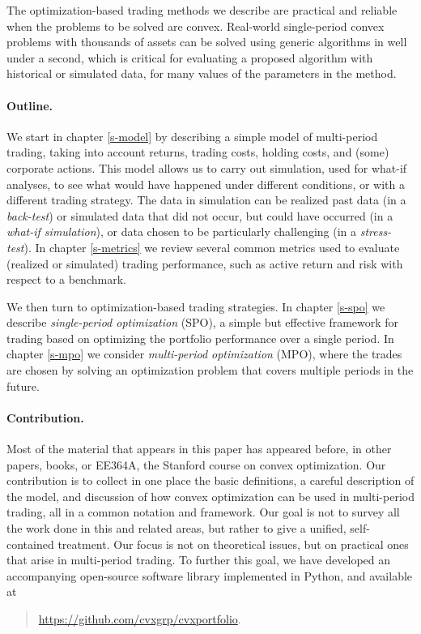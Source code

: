 \documentclass[openany]{article}  %
\begin{document}
The optimization-based trading methods we describe are practical
and reliable when the problems to be solved are convex.
Real-world single-period convex problems with thousands of assets can be
solved using generic algorithms in well under a second,
which is critical for evaluating
a proposed algorithm with historical or simulated data, for many values of
the parameters in the method.

\paragraph{Outline.}
We start in chapter \ref{s-model} by describing a simple model of
multi-period trading, taking into account returns, trading costs,
holding costs, and (some) corporate actions.
This model allows us to carry out simulation, used
for what-if analyses, to see what would have happened
under different conditions, or with a different trading strategy.
The data in simulation can be realized past data (in a \emph{back-test})
or simulated data that did not occur, but could have occurred
(in a \emph{what-if simulation}), or data chosen to be particularly
challenging (in a \emph{stress-test}).
In chapter \ref{s-metrics} we review several common metrics used to evaluate
(realized or simulated)
trading performance, such as active return and risk with respect to
a benchmark.

We then turn to optimization-based trading strategies.
In chapter \ref{s-spo} we describe \emph{single-period optimization} (SPO),
a simple but effective framework for trading based on
optimizing the portfolio performance over a single period.
In chapter \ref{s-mpo} we consider \emph{multi-period optimization} (MPO),
where the trades are chosen by solving an optimization problem
that covers multiple periods in the future.


\paragraph{Contribution.}
Most of the material that appears in this paper has appeared
before, in other papers, books, or EE364A, the Stanford course on
convex optimization.  Our contribution is to collect in one place
the basic definitions, a careful description of the model,
and discussion of how convex optimization
can be used in multi-period trading, all in a
common notation and framework.  Our goal is not to survey all the work
done in this and related areas, but rather to give a unified,
self-contained treatment.  Our focus is not on theoretical issues,
but on practical ones that arise in multi-period trading.
To further this goal,
we have developed an accompanying open-source software library
implemented in Python, and available at
\begin{quote}
\url{https://github.com/cvxgrp/cvxportfolio}.
\end{quote}
\end{document}
